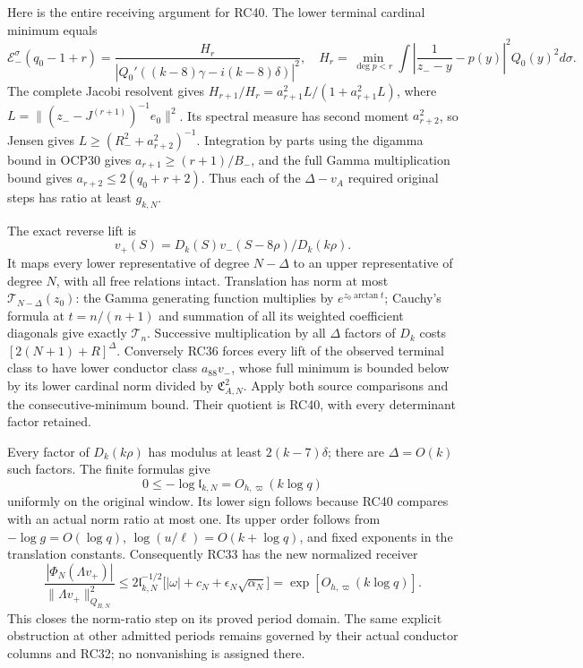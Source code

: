 \documentclass[10pt]{article}
\begin{document}
Here is the entire receiving argument for RC40. The lower terminal cardinal minimum equals \[
\mathcal E_-^\sigma(q_0-1+r)
=\frac{H_r}{|Q_0'((k-8)\gamma-i(k-8)\delta)|^2},
\quad
H_r=\min_{\deg p<r}\int\left|\frac1{z_--y}-p(y)\right|^2Q_0(y)^2d\sigma.
\] The complete Jacobi resolvent gives \(H_{r+1}/H_r=a_{r+1}^2 L/(1+a_{r+1}^2L)\), where \(L=\|(z_--J^{(r+1)})^{-1}e_0\|^2\). Its spectral measure has second moment \(a_{r+2}^2\), so Jensen gives \(L\ge(R_-^2+a_{r+2}^2)^{-1}\). Integration by parts using the digamma bound in OCP30 gives \(a_{r+1}\ge(r+1)/B_-\), and the full Gamma multiplication bound gives \(a_{r+2}\le2(q_0+r+2)\). Thus each of the \(\Delta-v_A\) required original steps has ratio at least \(g_{k,N}\).

The exact reverse lift is \[
v_+(S)=D_k(S)v_-(S-8\rho)/D_k(k\rho).
\] It maps every lower representative of degree \(N-\Delta\) to an upper representative of degree \(N\), with all free relations intact. Translation has norm at most \(\mathcal T_{N-\Delta}(z_0)\): the Gamma generating function multiplies by \(e^{z_0\arctan t}\); Cauchy's formula at \(t=n/(n+1)\) and summation of all its weighted coefficient diagonals give exactly \(\mathcal T_n\). Successive multiplication by all \(\Delta\) factors of \(D_k\) costs \([2(N+1)+R]^\Delta\). Conversely RC36 forces every lift of the observed terminal class to have lower conductor class \(a_{88}v_-\), whose full minimum is bounded below by its lower cardinal norm divided by \(\mathfrak C_{A,N}^2\). Apply both source comparisons and the consecutive-minimum bound. Their quotient is RC40, with every determinant factor retained.

Every factor of \(D_k(k\rho)\) has modulus at least \(2(k-7)\delta\); there are \(\Delta=O(k)\) such factors. The finite formulas give \[
0\le-\log\mathfrak l_{k,N}=O_{h,\varpi}(k\log q)
\tag{RC42}
\] uniformly on the original window. Its lower sign follows because RC40 compares with an actual norm ratio at most one. Its upper order follows from \(-\log g=O(\log q)\), \(\log(u/\ell)=O(k+\log q)\), and fixed exponents in the translation constants. Consequently RC33 has the new normalized receiver \[
\boxed{
\frac{|\Phi_N(\Lambda v_+)|}{\|\Lambda v_+\|_{Q_{B,N}}^2}
\le
2\mathfrak l_{k,N}^{-1/2}
\bigl[|\omega|+c_N+\epsilon_N\sqrt{\alpha_N}\bigr]
=\exp[O_{h,\varpi}(k\log q)].
}
\tag{RC43}
\] This closes the norm-ratio step on its proved period domain. The same explicit obstruction at other admitted periods remains governed by their actual conductor columns and RC32; no nonvanishing is assigned there.
\end{document}
